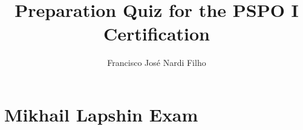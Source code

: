 \documentclass[a4paper,11pt]{article}
\begin{document}
\title{\bf{Preparation Quiz for the PSPO I Certification}}
\author{Francisco Jos\'e Nardi Filho}
\date{}
\maketitle


\section*{Mikhail Lapshin Exam}

%
\end{document}
